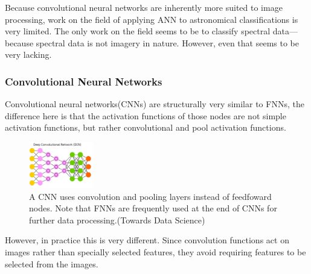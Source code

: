 \documentclass[a4paper,11pt]{article}
\begin{document}
Because convolutional neural networks are inherently more suited to image processing, work on the field of applying ANN to astronomical classifications is very limited. The only work on the field seems to be to classify spectral data—because spectral data is not imagery in nature.\cite{hampton_2017_using} However, even that seems to be very lacking.

\subsubsection{Convolutional Neural Networks}
Convolutional neural networks(CNNs) are structurally very similar to FNNs, the difference here is that the activation functions of those nodes are not simple activation functions, but rather convolutional and pool activation functions. 
\begin{figure}[ht]
\centering
\includegraphics[width=0.25\textwidth]{CNN.png}
\caption{\label{fig:CNN}A CNN uses convolution and pooling layers instead of feedfoward nodes. Note that FNNs are frequently used at the end of CNNs for further data processing.(Towards Data Science)}
\end{figure}

However, in practice this is very different. Since convolution functions act on images rather than specially selected features, they avoid requiring features to be selected from the images.
\end{document}
